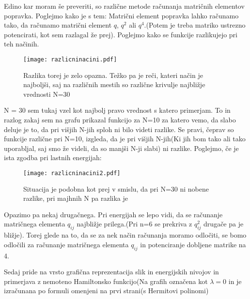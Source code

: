 \documentclass{article}
\begin{document}
Edino kar moram še preveriti, so različne metode računanja matričnih elementov popravka. Poglejmo kako je s tem:
Matrični element popravka lahko računamo tako, da računamo matrični element $q$, $q^2$ ali $q^4$.(Potem je treba matriko ustrezno potencirati, kot sem razlagal že prej). Poglejmo kako se funkcije razlikujejo pri teh načinih.

\begin{figure}[H]
\texttt{[image: razlicninacini.pdf]}
\caption*{Razlika torej je zelo opazna. Težko pa je reči, kateri način je najboljši, saj na različnih mestih so različne krivulje najbližje vrednosti N=30}
\end{figure}
N = 30 sem tukaj vzel kot najbolj pravo vrednost s katero primerjam. To in razlog zakaj sem na grafu prikazal funkcijo za N=10 za katero vemo, da slabo deluje je to, da pri višjih N-jih sploh ni bilo videti razlike. Se pravi, čeprav so funkcije različne pri N=10, izgleda, da je pri višjih N-jih(Ki jih bom tako ali tako uporabljal, saj smo že videli, da so manjši N-ji slabi) ni razlike. Poglejmo, če je ista zgodba pri lastnih energijah:

\begin{figure}[H]
\texttt{[image: razlicninacini2.pdf]}
\caption*{Situacija je podobna kot prej  v smislu, da pri N=30 ni nobene razlike, pri majhnih N pa razlika je}
\end{figure}
Opazimo pa nekaj drugačnega. Pri energijah se lepo vidi, da se računanje matričnega elementa $q_{ij}$ najbližje prilega.(Pri n=6 se prekriva z $q^2_{ij}$ drugače pa je bližje). Torej glede na to, da se za nek način računanja moramo odločiti, se bomo odločili za računanje
matričnega elementa $q_{ij}$ in potenciranje dobljene matrike na 4.

Sedaj pride na vrsto grafična reprezentacija slik in energijskih nivojov in primerjava z nemoteno Hamiltonsko funkcijo(Na grafih označena kot $\lambda = 0$ in je izračunana po formuli omenjeni na prvi strani(s Hermitovi polinomi)
\end{document}
